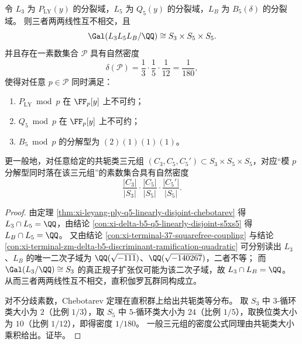 \begin{conclusion}\label{con:xi-delta-b5-triple-product-chebotarev-density}
令 \(L_3\) 为 \(P_{\mathrm{LY}}(y)\) 的分裂域，\(L_5\) 为 \(Q_5(y)\) 的分裂域，\(L_B\) 为 \(B_5(\delta)\) 的分裂域。
则三者两两线性互不相交，且
\[
\Gal(L_3L_5L_B/\QQ)\cong S_3\times S_5\times S_5.
\]
并且存在一素数集合 \(\mathcal P\) 具有自然密度
\[
\delta(\mathcal P)=\frac{1}{3}\cdot\frac{1}{5}\cdot\frac{1}{12}=\frac{1}{180},
\]
使得对任意 \(p\in\mathcal P\) 同时满足：
\begin{enumerate}
  \item \(P_{\mathrm{LY}}\bmod p\) 在 \(\FF_p[y]\) 上不可约；
  \item \(Q_5\bmod p\) 在 \(\FF_p[y]\) 上不可约；
  \item \(B_5\bmod p\) 的分解型为 \((2)(1)(1)(1)\)。
\end{enumerate}
更一般地，对任意给定的共轭类三元组 \((C_3,C_5,C_5')\subset S_3\times S_5\times S_5\)，对应“模 \(p\) 分解型同时落在该三元组”的素数集合具有自然密度
\[
\frac{|C_3|}{|S_3|}\cdot\frac{|C_5|}{|S_5|}\cdot\frac{|C_5'|}{|S_5|}.
\]
\end{conclusion}
\begin{proof}
由定理 \ref{thm:xi-leyang-ply-q5-linearly-disjoint-chebotarev} 得 \(L_3\cap L_5=\QQ\)，由结论 \ref{con:xi-delta-b5-q5-linearly-disjoint-s5xs5} 得 \(L_B\cap L_5=\QQ\)。
又由结论 \ref{con:xi-terminal-37-squarefree-coupling} 与结论 \ref{con:xi-terminal-zm-delta-b5-discriminant-ramification-quadratic} 可分别读出 \(L_3\)、\(L_B\) 的唯一二次子域为 \(\QQ(\sqrt{-111})\)、\(\QQ(\sqrt{-140267})\)，二者不等；
而 \(\Gal(L_3/\QQ)\cong S_3\) 的真正规子扩张仅可能为该二次子域，故 \(L_3\cap L_B=\QQ\)。
从而三者两两线性互不相交，直积伽罗瓦群同构成立。
\par
对不分歧素数，Chebotarev 定理在直积群上给出共轭类等分布。
取 \(S_3\) 中 \(3\)-循环类大小为 \(2\)（比例 \(1/3\)），取 \(S_5\) 中 \(5\)-循环类大小为 \(24\)（比例 \(1/5\)），取换位类大小为 \(10\)（比例 \(1/12\)），即得密度 \(1/180\)。
一般三元组的密度公式同理由共轭类大小乘积给出。证毕。
\end{proof}

\endinput
